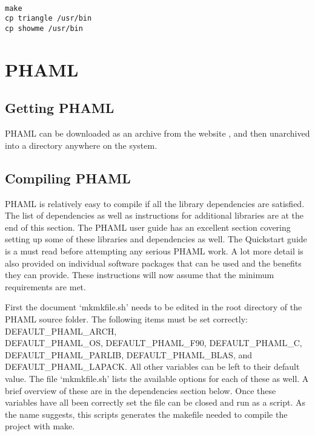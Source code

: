 \begin{framecode}{6in}
\begin{verbatim}

make
cp triangle /usr/bin
cp showme /usr/bin

\end{verbatim}
\end{framecode}

\section{PHAML}

\subsection{Getting PHAML}
PHAML can be downloaded as an archive from the website \cite{PHAML:website}, and then unarchived into a directory anywhere on the system.

\subsection{Compiling PHAML}

PHAML is relatively easy to compile if all the library dependencies are satisfied.  The list of dependencies as well as instructions for additional libraries are at the end of this section.  The PHAML user guide \cite{phamldoc} has an excellent section covering setting up some of these libraries and dependencies as well.  The Quickstart guide is a must read before attempting any serious PHAML work.  A lot more detail is also provided on individual software packages that can be used and the benefits they can provide.  These instructions will now assume that the minimum requirements are met.

First the document `mkmkfile.sh' needs to be edited in the root directory of the PHAML source folder.  The following items must be set correctly: DEFAULT\_PHAML\_ARCH, \\ DEFAULT\_PHAML\_OS, DEFAULT\_PHAML\_F90, DEFAULT\_PHAML\_C, \\ DEFAULT\_PHAML\_PARLIB, DEFAULT\_PHAML\_BLAS, and DEFAULT\_PHAML\_LAPACK.  
All other variables can be left to their default value.  The file `mkmkfile.sh' lists the available options for each of these as well.  A brief overview of these are in the dependencies section below.  Once these variables have all been correctly set the file can be closed and run as a script.  As the name suggests, this scripts generates the makefile needed to compile the project with make.

